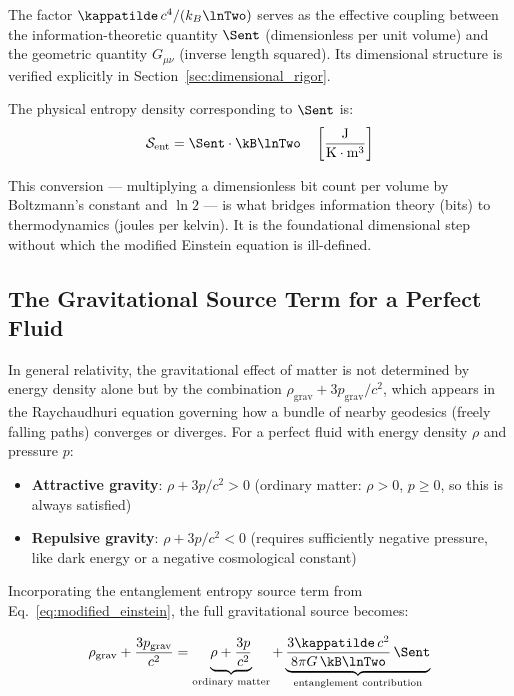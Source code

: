 \noindent The factor $\kappatilde\,c^4/(k_B\lnTwo)$ serves as the effective
coupling between the information-theoretic quantity $\Sent$ (dimensionless
per unit volume) and the geometric quantity $G_{\mu\nu}$ (inverse length
squared). Its dimensional structure is verified explicitly in
Section~\ref{sec:dimensional_rigor}.

The physical entropy density corresponding to $\Sent$ is:
\begin{equation}
    \mathcal{S}_{\text{ent}} = \Sent \cdot \kB\lnTwo
    \quad \left[\frac{\text{J}}{\text{K}\cdot\text{m}^3}\right]
    \label{eq:entropy_density_conversion}
\end{equation}

\noindent This conversion --- multiplying a dimensionless bit count per
volume by Boltzmann's constant and $\ln 2$ --- is what bridges
information theory (bits) to thermodynamics (joules per kelvin).
It is the foundational dimensional step without which the modified
Einstein equation is ill-defined.

\subsection{The Gravitational Source Term for a Perfect Fluid}
\label{subsec:source_term}

In general relativity, the gravitational effect of matter is not determined
by energy density alone but by the combination
$\rho_{\text{grav}} + 3p_{\text{grav}}/c^2$, which appears in the
Raychaudhuri equation governing how a bundle of nearby geodesics (freely
falling paths) converges or diverges. For a perfect fluid with energy density
$\rho$ and pressure $p$:

\begin{itemize}
    \item \textbf{Attractive gravity}: $\rho + 3p/c^2 > 0$
    (ordinary matter: $\rho > 0$, $p \geq 0$, so this is always satisfied)
    \item \textbf{Repulsive gravity}: $\rho + 3p/c^2 < 0$
    (requires sufficiently negative pressure, like dark energy or a
    negative cosmological constant)
\end{itemize}

Incorporating the entanglement entropy source term from
Eq.~\eqref{eq:modified_einstein}, the full gravitational source becomes:

\begin{equation}
    \rho_{\text{grav}} + \frac{3p_{\text{grav}}}{c^2}
    = \underbrace{\rho + \frac{3p}{c^2}}_{\text{ordinary matter}}
    + \underbrace{\frac{3\kappatilde\,c^2}{8\pi G\,\kB\lnTwo}\,
    \Sent}_{\text{entanglement contribution}}
    \label{eq:source_term}
\end{equation}

